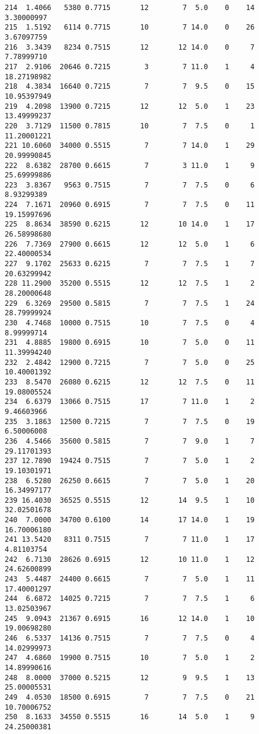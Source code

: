 \documentclass[
  letterpaper,
  DIV=11,
  numbers=noendperiod]{scrreprt}
\begin{document}
\begin{verbatim}
214  1.4066   5380 0.7715       12        7  5.0    0    14  3.30000997
215  1.5192   6114 0.7715       10        7 14.0    0    26  3.67097759
216  3.3439   8234 0.7515       12       12 14.0    0     7  7.78999710
217  2.9106  20646 0.7215        3        7 11.0    1     4 18.27198982
218  4.3834  16640 0.7215        7        7  9.5    0    15 10.95397949
219  4.2098  13900 0.7215       12       12  5.0    1    23 13.49999237
220  3.7129  11500 0.7815       10        7  7.5    0     1 11.20001221
221 10.6060  34000 0.5515        7        7 14.0    1    29 20.99990845
222  8.6382  28700 0.6615        7        3 11.0    1     9 25.69999886
223  3.8367   9563 0.7515        7        7  7.5    0     6  8.93299389
224  7.1671  20960 0.6915        7        7  7.5    0    11 19.15997696
225  8.8634  38590 0.6215       12       10 14.0    1    17 26.58998680
226  7.7369  27900 0.6615       12       12  5.0    1     6 22.40000534
227  9.1702  25633 0.6215        7        7  7.5    1     7 20.63299942
228 11.2900  35200 0.5515       12       12  7.5    1     2 28.20000648
229  6.3269  29500 0.5815        7        7  7.5    1    24 28.79999924
230  4.7468  10000 0.7515       10        7  7.5    0     4  8.99999714
231  4.8885  19800 0.6915       10        7  5.0    0    11 11.39994240
232  2.4842  12900 0.7215        7        7  5.0    0    25 10.40001392
233  8.5470  26080 0.6215       12       12  7.5    0    11 19.08005524
234  6.6379  13066 0.7515       17        7 11.0    1     2  9.46603966
235  3.1863  12500 0.7215        7        7  7.5    0    19  6.50006008
236  4.5466  35600 0.5815        7        7  9.0    1     7 29.11701393
237 12.7890  19424 0.7515        7        7  5.0    1     2 19.10301971
238  6.5280  26250 0.6615        7        7  5.0    1    20 16.34997177
239 16.4030  36525 0.5515       12       14  9.5    1    10 32.02501678
240  7.0000  34700 0.6100       14       17 14.0    1    19 16.70006180
241 13.5420   8311 0.7515        7        7 11.0    1    17  4.81103754
242  6.7130  28626 0.6915       12       10 11.0    1    12 24.62600899
243  5.4487  24400 0.6615        7        7  5.0    1    11 17.40001297
244  6.6872  14025 0.7215        7        7  7.5    1     6 13.02503967
245  9.0943  21367 0.6915       16       12 14.0    1    10 19.00698280
246  6.5337  14136 0.7515        7        7  7.5    0     4 14.02999973
247  4.6860  19900 0.7515       10        7  5.0    1     2 14.89990616
248  8.0000  37000 0.5215       12        9  9.5    1    13 25.00005531
249  4.0530  18500 0.6915        7        7  7.5    0    21 10.70006752
250  8.1633  34550 0.5515       16       14  5.0    1     9 24.25000381

\end{verbatim}
\end{document}
